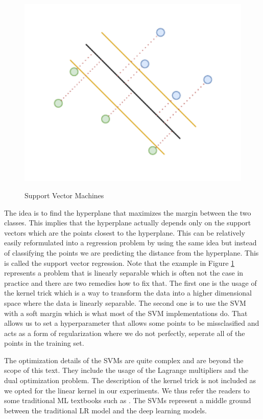 \begin{figure}[!h]
    \centering
    \caption{Support Vector Machines}
        \includegraphics[width=1\textwidth]{Figures/SVM_idea.drawio.pdf}
    \label{fig:svm}
\end{figure}


The idea is to find the hyperplane that maximizes the margin between the two classes.
This implies that the hyperplane actually depends only on the support vectors which are the points
closest to the hyperplane. This can be relatively easily reformulated
into a regression problem by using the same idea but instead of classifying the points
we are predicting the distance from the hyperplane. This is called the support vector regression.
Note that the example in Figure \ref{fig:svm} represents a problem that is linearly separable
which is often not the case in practice and there are two remedies how to fix that.
The first one is the usage of the kernel trick which is a way to transform the data into a higher dimensional space
where the data is linearly separable. The second one is to use the \ac{SVM} with a soft margin which is
what most of the \ac{SVM} implementations do. That allows us to set a hyperparameter that allows
some points to be missclasified and acts as a form of regularization where we do not perfectly,
seperate all of the points in the training set. 


The optimization details of the \ac{SVM}s are quite complex and are beyond the scope of this text.
They include the usage of the Lagrange multipliers and the dual optimization problem. The description
of the kernel trick is not included as we opted for the linear kernel in our experiments.
We thus refer the readers to some traditional \ac{ML} textbooks such as \cite{bishop2006pattern}.
The \ac{SVM}s represent a middle ground between the traditional \ac{LR} model and the deep learning models.


